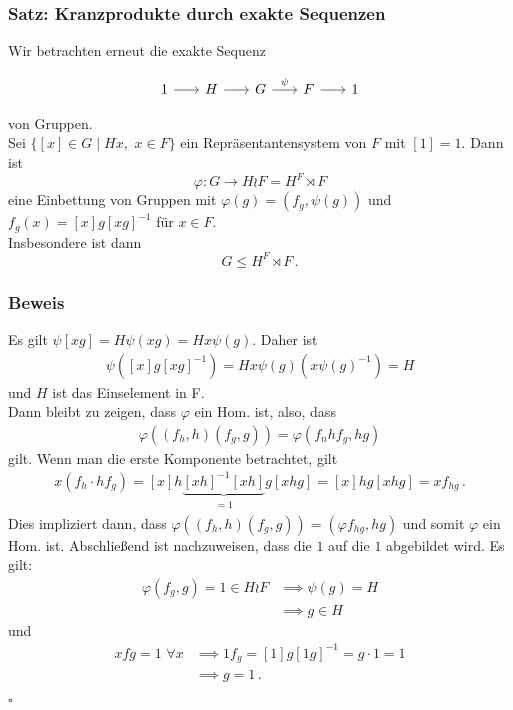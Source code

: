 \documentclass[12pt, german]{article}
\newcommand{\bewiesen}{
	
	\begin{flushright}
		$\square$  \\
\end{flushright}}
\begin{document}
	\subsubsection{Satz: Kranzprodukte durch exakte Sequenzen}
	Wir betrachten erneut die exakte Sequenz 
	\begin{figure}[H]
		\centering
		\begin{equation*}
			\begin{tikzcd}[column sep=1.5pc]
				1 \arrow{r}{} & H \arrow{r}{} & G \arrow{r}{\psi} & F \arrow{r}{} & 1
			\end{tikzcd}
		\end{equation*}
	\end{figure} 
	von Gruppen.\\
	Sei $\{[x] \in G \mid Hx, \, \, x \in F\}$ ein Repräsentantensystem von $F$ mit $[1] = 1$. 
	Dann ist $$\varphi: G \to H \wr F = H^F \rtimes F$$ eine Einbettung von Gruppen mit $\varphi(g) = (f_g, \psi(g))$ und $f_g(x) = [x]g[xg]^{-1}$ für $x \in F$. \\  Insbesondere ist dann $$G \leq H^F \rtimes F\, .$$
	
	\subsubsection{Beweis}
	Es gilt $\psi[xg] = H\psi(xg) = Hx\psi(g)$. Daher ist
	\begin{align*}
		\psi([x]g[xg]^{-1}) = Hx\psi(g)(x\psi(g)^{-1}) = H
	\end{align*}
	und $H$ ist das Einselement in F.\\
	Dann bleibt zu zeigen, dass $\varphi$ ein Hom. ist, also, dass
	\begin{align*}
		\varphi((f_h, h)(f_g, g)) = \varphi(f_nhf_g, hg) 
	\end{align*}
	gilt. Wenn man die erste Komponente betrachtet, gilt
	\begin{align*}
		x(f_h \cdot hf_g) = [x]h\underbrace{[xh]^{-1}[xh]}_{\substack{=1}}g[xhg] = [x]hg[xhg] = xf_{hg}\, .
	\end{align*}
	Dies impliziert dann, dass $\varphi((f_h, h)(f_g,g)) = (\varphi f_{hg}, hg)$ und somit $\varphi$ ein Hom. ist. 
	Abschlie\ss end ist nachzuweisen, dass die $1$ auf die $1$ abgebildet wird. Es gilt:
	\begin{align*}
		\varphi(f_g, g) = 1 \in H \wr F &\implies \psi(g) = H \\
		&\implies g \in H
	\end{align*}
	und
	\begin{align*}
		xfg = 1 \, \, \forall x &\implies 1f_g = [1]g[1g]^{-1} = g \cdot 1 = 1 \\
		&\implies g = 1\, .
	\end{align*}
	\bewiesen
	
\end{document}
